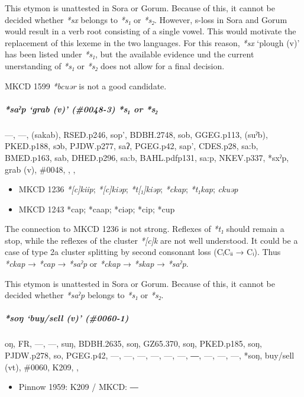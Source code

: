 \documentclass[a4paper,]{article}
\providecommand{\tightlist}{%
  \setlength{\itemsep}{0pt}\setlength{\parskip}{0pt}}
\let\oldsubparagraph\subparagraph
\renewcommand{\subparagraph}[1]{\oldsubparagraph{#1}\mbox{}}
\begin{document}
This etymon is unattested in Sora or Gorum. Because of this, it cannot
be decided whether \emph{*sx} belongs to \emph{*s₁} or \emph{*s₂}.
However, s-loss in Sora and Gorum would result in a verb root consisting
of a single vowel. This would motivate the replacement of this lexeme in
the two languages. For this reason, \emph{*sx} `plough (v)' has been
listed under \emph{*s₁}, but the available evidence und the current
unerstanding of \emph{*s₁} or \emph{*s₂} does not allow for a final
decision.

MKCD 1599 \emph{*bcuər} is not a good candidate.

\subparagraph{\texorpdfstring{\emph{*saˀp} `grab (v)' (\#0048-3)
\emph{*s₁} or
\emph{*s₂}}{*saˀp grab (v) (\#0048-3) *s₁ or *s₂}}\label{saux2c0p-grab-v-0048-3-s-or-s}

---, ---, (sakab), RSED.p246, sop', BDBH.2748, sob, GGEG.p113, (suˀb),
PKED.p188, sɔb, PJDW.p277, saʔ, PGEG.p42, sap', CDES.p28, sa:b,
BMED.p163, sab, DHED.p296, sa:b, BAHL.pdfp131, sa:p, NKEV.p337, *sxˀp,
grab (v), \#0048, , ,

\begin{itemize}
\tightlist
\item
  MKCD 1236 \emph{*{[}c{]}kiip}; \emph{*{[}c{]}kiəp};
  \emph{*t{[}₁{]}kiəp}; \emph{*ckap}; \emph{*t₁kap}; \emph{ckuəp}
\item
  MKCD 1243 *cap; *caap; *ciəp; *cip; *cup
\end{itemize}

The connection to MKCD 1236 is not strong. Reflexes of \emph{*t₁} should
remain a stop, while the reflexes of the cluster \emph{*{[}c{]}k} are
not well understood. It could be a case of type 2a cluster splitting by
second consonant loss (CᵢCᵢᵢ → Cᵢ). Thus \emph{*ckap} → \emph{*cap} →
\emph{*saˀp} or \emph{*ckap} → \emph{*skap} → \emph{*saˀp}.

This etymon is unattested in Sora or Gorum. Because of this, it cannot
be decided whether \emph{*saˀp} belongs to \emph{*s₁} or \emph{*s₂}.

\subparagraph{\texorpdfstring{\emph{*soŋ} `buy/sell (v)'
(\#0060-1)}{*soŋ buy/sell (v) (\#0060-1)}}\label{soux14b-buysell-v-0060-1}

oŋ, FR, ---, ---, suŋ, BDBH.2635, soŋ, GZ65.370, soŋ, PKED.p185, soŋ,
PJDW.p278, so, PGEG.p42, ---, ---, ---, ---, ---, ---, ―, ---, ---, ---,
*soŋ, buy/sell (vt), \#0060, K209, ,

\begin{itemize}
\tightlist
\item
  Pinnow 1959: K209 / MKCD: ―
\end{itemize}
\end{document}
